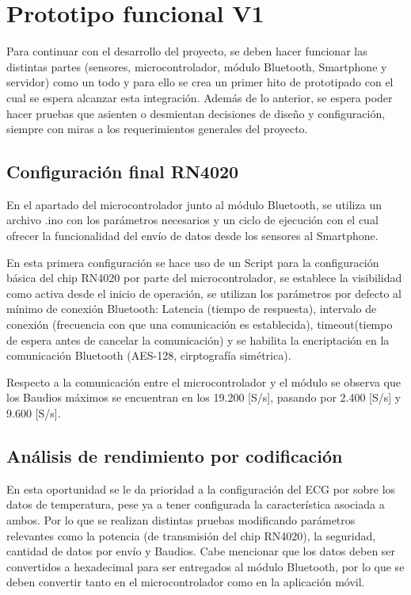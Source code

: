 \chapter{Prototipo funcional V1}\label{proto1}

Para continuar con el desarrollo del proyecto, se deben hacer funcionar las distintas partes (sensores, microcontrolador, módulo Bluetooth, Smartphone y servidor) como un todo y para ello se crea un primer hito de prototipado con el cual se espera alcanzar esta integración. Además de lo anterior, se espera poder hacer pruebas que asienten o desmientan decisiones de diseño y configuración, siempre con miras a los requerimientos generales del proyecto.

\section{Configuración final RN4020}

En el apartado del microcontrolador junto al módulo Bluetooth, se utiliza un archivo .ino con los parámetros necesarios y un ciclo de ejecución con el cual ofrecer la funcionalidad del envío de datos desde los sensores al Smartphone.

En esta primera configuración se hace uso de un Script para la configuración básica del chip RN4020 por parte del microcontrolador, se establece la visibilidad como activa desde el inicio de operación, se utilizan los parámetros por defecto al mínimo de conexión Bluetooth: Latencia (tiempo de respuesta), intervalo de conexión (frecuencia con que una comunicación es establecida), timeout(tiempo de espera antes de cancelar la comunicación) y se habilita la encriptación en la comunicación Bluetooth (AES-128, cirptografía simétrica).

Respecto a la comunicación entre el microcontrolador y el módulo se observa que los Baudios máximos se encuentran en los 19.200 [S/s], pasando por 2.400 [S/s] y 9.600 [S/s].\newpage


\section{Análisis de rendimiento por codificación }

En esta oportunidad se le da prioridad a la configuración del ECG por sobre los datos de temperatura, pese ya a tener configurada la característica asociada a ambos. Por lo que se realizan distintas pruebas modificando parámetros relevantes como la potencia (de transmisión del chip RN4020), la seguridad, cantidad de datos por envío y Baudios. Cabe mencionar que los datos deben ser convertidos a hexadecimal para ser entregados al módulo Bluetooth, por lo que se deben convertir tanto en el microcontrolador como en la aplicación móvil.

